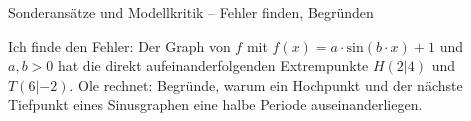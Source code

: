 \begin{aufgabe}{Sonderansätze und Modellkritik – Fehler finden, Begründen}
\begin{teile}
\teil Ich finde den Fehler: Der Graph von $f$ mit $f(x) = a \cdot \mathrm{sin}(b \cdot x) + 1$ und $a, b > 0$ hat die direkt aufeinanderfolgenden Extrempunkte $H(2|4)$ und $T(6|-2)$. Ole rechnet: 
\teil Begründe, warum ein Hochpunkt und der nächste Tiefpunkt eines Sinusgraphen eine halbe Periode auseinanderliegen.
\end{teile}
\end{aufgabe}
